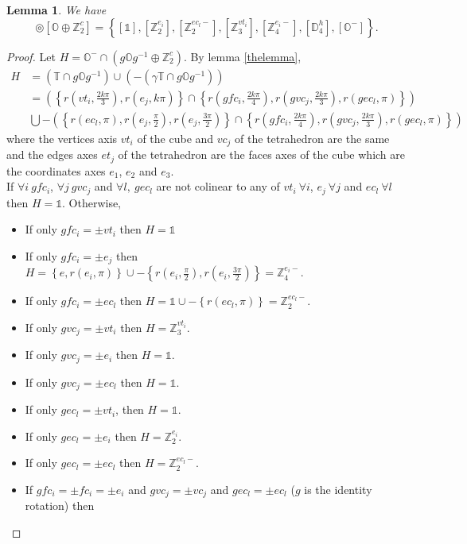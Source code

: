 \documentclass[11pt,a4paper]{amsart}
\newtheorem{lem}[thm]{Lemma}
\theoremstyle{definition}
\newcommand{\ZZ}{\mathbb{Z}}                %
\newcommand{\octa}{\mathbb{O}}              %
\newcommand{\tetra}{\mathbb{T}}             %
\newcommand{\DD}{\mathbb{D}}                %
\newcommand{\1}{\mathds{1}}		            %
\newcommand{\set}[1]{\left\{#1\right\}}     %
\begin{document}
\begin{lem}
We have
\begin{equation*}
[\octa^-] \circledcirc [\octa \oplus \ZZ_2^c]=\set{[\1],[\ZZ_2^{e_i}],[\ZZ_2^{ec_l-}],[\ZZ_3^{vt_i}],[\ZZ_4^{e_i-}],[\DD_4^h],[\octa^-]}.
\end{equation*}
\end{lem}
\begin{proof}
Let $H=\octa^-\cap(g\octa g^{-1} \oplus \ZZ_2^c)$.
By lemma \ref{thelemma},
\begin{align*}
H&=(\tetra\cap g \octa g^{-1})\cup (-(\gamma\tetra\cap g \octa g^{-1}))\\
&=\left(\set{r(vt_i,\frac{2k\pi}{3}),r(e_j,k\pi)}\cap \set{r(gfc_i,\frac{2k\pi}{4}),r(gvc_j,\frac{2k\pi}{3}),r(gec_l,\pi)}\right)\\
&\bigcup-\left(\set{r(ec_l,\pi),r(e_j,\frac{\pi}{2}),r(e_j,\frac{3\pi}{2})}\cap \set{r(gfc_i,\frac{2k\pi}{4}),r(gvc_j,\frac{2k\pi}{3}),r(gec_l,\pi)}\right)
\end{align*}
where the vertices axis $vt_i$ of the cube and $vc_j$ of the tetrahedron are the same and the edges axes $et_j$ of the tetrahedron are the faces axes of the cube which are the coordinates axes $e_1$, $e_2$ and $e_3$.\\
If $\forall i\ gfc_i$, $\forall j \ gvc_j$ and $\forall l,\ gec_l$ are not colinear to any of $vt_i\ \forall i$, $e_j\ \forall j$ and $ec_l\ \forall l$ then $H=\1$.
Otherwise,
\begin{itemize}
\item If only $gfc_i=\pm vt_i$ then $H=\1$
\item If only $gfc_i=\pm e_j$ then $H=\set{e,r(e_i,\pi)}\cup -\set{r(e_i,\frac{\pi}{2}),r(e_i,\frac{3\pi}{2})}=\ZZ_4^{e_i-}$.
\item If only $gfc_i=\pm ec_l$ then $H=\1\cup-\set{r(ec_l,\pi)}=\ZZ_2^{ec_l-}$.
\item If only $gvc_j=\pm vt_i$ then $H=\ZZ_3^{vt_i}$.
\item If only $gvc_j=\pm e_i$ then $H=\1$.
\item If only $gvc_j=\pm ec_l$ then $H=\1$.
\item If only $gec_l=\pm vt_i$, then $H=\1$.
\item If only $gec_l=\pm e_i$ then $H=\ZZ_2^{e_i}.$
\item If only $gec_l=\pm ec_l$ then $H=\ZZ_2^{ec_l-}.$
\item If $gfc_i=\pm fc_i=\pm e_i$ and $gvc_j=\pm vc_j$ and $gec_l=\pm ec_l$ ($g$ is the identity rotation) then
\begin{equation*}

\end{equation*}
\end{itemize}
\end{proof}
\end{document}
